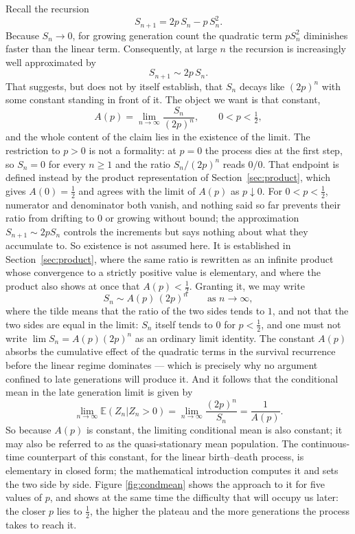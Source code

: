 \documentclass[11pt]{article}
\newcommand{\ChM}{the mathematical introduction}
\begin{document}
Recall the recursion
\[
S_{n+1} = 2p\, S_n - p\, S_n^2.
\]
Because $S_n \to 0$, for growing generation count the quadratic term $p S_n^2$ diminishes faster than the
linear term. Consequently, at large $n$ the recursion is increasingly well approximated by
\[
S_{n+1} \sim 2p\, S_n.
\]
That suggests, but does not by itself establish, that $S_n$ decays like $(2p)^n$ with some constant standing in front of it. The object we want is that constant,
\begin{equation}
\label{eq:Ap-def-main}
 A(p) = \lim_{n \to \infty} \frac{S_n}{(2p)^n},
 \qquad 0<p<\tfrac12,
\end{equation}
and the whole content of the claim lies in the existence of the limit. The restriction to $p>0$ is not a formality: at $p=0$ the process dies at the first step, so $S_n=0$ for every $n\ge1$ and the ratio $S_n/(2p)^n$ reads $0/0$. That endpoint is defined instead by the product representation of Section~\ref{sec:product}, which gives $A(0)=\tfrac12$ and agrees with the limit of $A(p)$ as $p\downarrow0$. For $0<p<\tfrac12$, numerator and denominator both vanish, and nothing said so far prevents their ratio from drifting to $0$ or growing without bound; the approximation $S_{n+1}\sim 2p S_n$ controls the increments but says nothing about what they accumulate to. So existence is not assumed here. It is established in Section~\ref{sec:product}, where the same ratio is rewritten as an infinite product whose convergence to a strictly positive value is elementary, and where the product also shows at once that $A(p)<\tfrac12$. Granting it, we may write
\begin{equation}
\label{eq:Sn-asymp}
S_n \sim A(p)\,(2p)^n
\qquad\text{as }n\to\infty,
\end{equation}
where the tilde means that the ratio of the two sides tends to $1$, and not that the two sides are equal in the limit: $S_n$ itself tends to $0$ for $p<\tfrac12$, and one must not write $\lim S_n = A(p)(2p)^n$ as an ordinary limit identity.
The constant $A(p)$ absorbs the cumulative effect of the quadratic terms in the survival recurrence before the linear regime dominates --- which is precisely why no argument confined to late generations will produce it.
And it follows that the conditional mean in the late generation limit is given by
\[
 \lim_{n\to\infty} \mathbb{E}(Z_n | Z_n > 0) = \lim_{n \to \infty} \frac{(2p)^n}{S_n} = \frac{1}{A(p)}.
\]
So because $A(p)$ is constant, the limiting conditional mean is also constant; it may also be referred to as the quasi-stationary mean population. The continuous-time counterpart of this constant, for the linear birth--death process, is elementary in closed form; \ChM{} computes it and sets the two side by side. Figure \ref{fig:condmean} shows the approach to it for five values of $p$, and shows at the same time the difficulty that will occupy us later: the closer $p$ lies to $\tfrac12$, the higher the plateau and the more generations the process takes to reach it.
\end{document}
